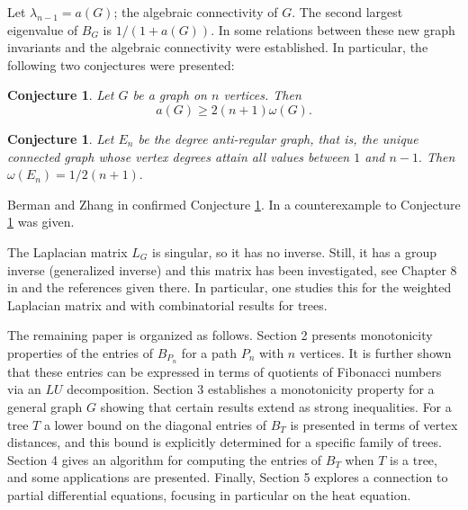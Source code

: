 \documentclass[12pt]{article}
\newtheorem{Conjecture}[theorem]{Conjecture}
\begin{document}
\noindent Let $\lambda_{n-1} =a(G)$; the algebraic connectivity of $G$. The second largest eigenvalue of $B_G$ is $1/(1 + a(G)).$ In \cite{Merris_II} some relations between these new graph invariants and the algebraic connectivity were established. In particular, the following two conjectures were presented:

\begin{Conjecture}\cite{Merris_II}\label{1.2}
Let $G$ be a graph on $n$ vertices. Then
$$a(G) \geq  2(n + 1)\omega(G).$$
\end{Conjecture}
\begin{Conjecture} \cite{Merris_II}\label{1.1}
 Let $E_n$ be the degree anti-regular graph, that is, the unique connected graph whose
vertex degrees attain all values between $1$ and $n-1.$ Then
$\omega(E_n) = 1 /2(n + 1).$
\end{Conjecture}

\noindent Berman and Zhang in \cite{Berman} confirmed Conjecture \ref{1.2}. In \cite{Zhang} a counterexample to Conjecture \ref{1.1} was given. 

The Laplacian matrix $L_G$ is singular, so it has no inverse. Still, it has a group inverse (generalized inverse) and this matrix has been investigated, see Chapter 8 in \cite{Molitierno11} and the references given there. In particular, one studies this for the weighted Laplacian matrix and with combinatorial results for trees. 

The remaining paper is organized as follows. Section 2 presents monotonicity properties of the entries of $B_{P_n}$ for a path $P_n$ with $n$ vertices. It is further shown that these entries can be expressed in terms of quotients of Fibonacci numbers via an $LU$ decomposition. Section 3 establishes a monotonicity property for a general graph $G$ showing that certain results extend as strong inequalities. For a tree $T$ a lower bound on the diagonal entries of $B_T$ is presented in terms of vertex distances, and this bound is explicitly determined for a specific family of trees.
Section 4 gives an algorithm for computing the entries of $B_T$ when $T$ is a tree, and  some applications are presented. Finally, Section 5 explores a connection to partial differential equations, focusing in particular on the heat equation. 
\end{document}
